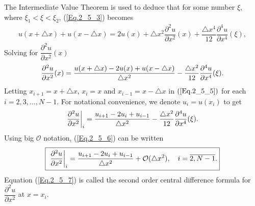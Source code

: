 The Intermediate Value Theorem is used to deduce that for some number $\xi$, where $\xi_{1} < \xi < \xi_{2}$, (\ref{Eq.2_5_3}) becomes
\begin{align*} %
u(x + \triangle x ) + u(x - \triangle x ) = 2u(x) + \triangle x^{2} \dfrac{\partial^{2} u}{\partial x^{2} }(x) +   \dfrac{\triangle x^{4}}{12}  \dfrac{\partial^{4} u}{\partial x^{4} }(\xi),
\end{align*}
Solving for $\dfrac{\partial^{2} u}{\partial x^{2} }(x) $
\begin{align} {\label{Eq.2_5_5}}
\dfrac{\partial^{2} u}{\partial x^{2} }(x)  = \dfrac{u(x + \triangle x ) - 2u(x) + u(x - \triangle x )}{ \triangle x^{2}} -  \dfrac{\triangle x^{2}}{12} \dfrac{\partial^{4} u}{\partial x^{4} }(\xi).
\end{align}
Letting $x_{i+1} = x+ \triangle x$, $x_{i} = x$ and $x_{i-1} = x- \triangle x$ in $(\ref{Eq.2_5_5})$ for each $i = 2,3,\dots,N-1$. For notational convenience, we denote $u_{i}=u(x_{i})$ to get
\begin{align}{\label{Eq.2_5_6}}
\dfrac{\partial^{2} u}{\partial x^{2} }\bigg|_{i}  = \dfrac{u_{i+1} - 2u_{i}+ u_{i-1}}{ \triangle x^{2}} -  \dfrac{\triangle x^{2}}{12} \dfrac{\partial^{4} u}{\partial x^{4} }(\xi).
\end{align}
Using big $\mathcal{O}$ notation, (\ref{Eq.2_5_6}) can be written
\begin{align}{\label{Eq.2_5_7}}
\fbox{ $ \displaystyle \dfrac{\partial^{2} u}{\partial x^{2} }\bigg|_{i}  = \dfrac{u_{i+1}  - 2u_{i} + u_{i-1}}{ \triangle x^{2}} + \mathcal{O}(\triangle x^{2}),\quad i =\overline{2,N-1}. $}
\end{align}
Equation (\ref{Eq.2_5_7}) is called the second order central difference formula for $\dfrac{\partial^{2} u}{\partial x^{2} }$ at $ x =x_{i} $.
